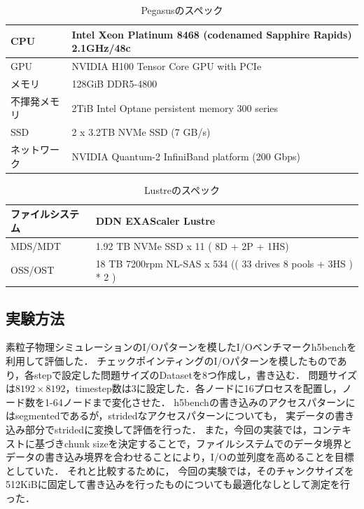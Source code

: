 \documentclass[submit,techrep,noauthor]{ipsj}
\begin{document}
\begin{table}[t]
	\caption{Pegasusのスペック}
	\label{tab:pegasus}
	\centering
	
	\begin{tabularx}{\linewidth}{Y|Y}
		\hline \hline
		CPU    & Intel Xeon Platinum 8468 (codenamed Sapphire Rapids) 2.1GHz/48c \\ \hline
		GPU    & NVIDIA H100 Tensor Core GPU with PCIe                           \\ \hline
		メモリ    & 128GiB DDR5-4800                                                \\ \hline
		不揮発メモリ & 2TiB Intel Optane persistent memory 300 series                  \\ \hline
		SSD    & 2 x 3.2TB NVMe SSD (7 GB/s)                                     \\ \hline
		ネットワーク & NVIDIA Quantum-2 InfiniBand platform (200 Gbps)                 \\ \hline
	\end{tabularx}
\end{table}

\begin{table}[t]
	\caption{Lustreのスペック}
	\label{tab:lustre}
	\centering
	
	\begin{tabularx}{\linewidth}{Y||Y}
		\hline \hline
		ファイルシステム & DDN EXAScaler Lustre                                          \\ \hline
		MDS/MDT  & 1.92 TB NVMe SSD x 11 ( 8D + 2P + 1HS)                        \\ \hline
		OSS/OST  & 18 TB 7200rpm NL-SAS x 534 (( 33 drives 8 pools + 3HS ) * 2 ) \\ \hline
	\end{tabularx}
\end{table}

\subsection{実験方法}
素粒子物理シミュレーションのI/Oパターンを模したI/Oベンチマークh5bench\cite{h5bench}を利用して評価した．
チェックポインティングのI/Oパターンを模したものであり，各stepで設定した問題サイズのDatasetを8つ作成し，書き込む．
問題サイズは$8192 \times 8192$，timestep数は3に設定した．各ノードに16プロセスを配置し，ノード数を1-64ノードまで変化させた．
h5benchの書き込みのアクセスパターンにはsegmentedであるが，stridedなアクセスパターンについても，
実データの書き込み部分でstridedに変換して評価を行った．
また，今回の実装では，コンテキストに基づきchunk sizeを決定することで，ファイルシステムでのデータ境界と
データの書き込み境界を合わせることにより，I/Oの並列度を高めることを目標としていた．
それと比較するために，
今回の実験では，そのチャンクサイズを512KiBに固定して書き込みを行ったものについても最適化なしとして測定を行った．
\end{document}
